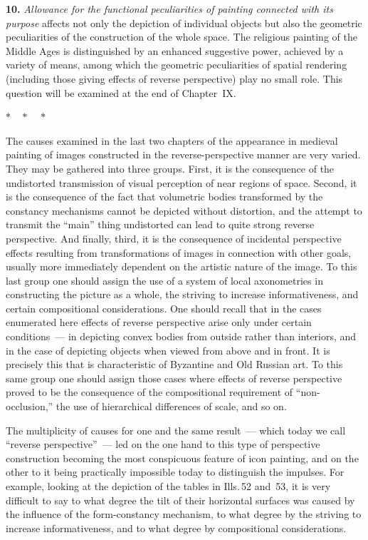 \medskip
\noindent\textbf{10.}\quad
\emph{Allowance for the functional peculiarities of painting connected with its
purpose} affects not only the depiction of individual objects but also the geometric
peculiarities of the construction of the whole space.  The religious painting of the
Middle Ages is distinguished by an enhanced suggestive power, achieved by a variety of
means, among which the geometric peculiarities of spatial rendering (including those
giving effects of reverse perspective) play no small role.  This question will be
examined at the end of Chapter~IX.

\medskip
\noindent
$* \quad * \quad *$
\medskip


The causes examined in the last two chapters of the appearance in medieval painting of
images constructed in the reverse-perspective manner are very varied.  They may be
gathered into three groups.  First, it is the consequence of the undistorted
transmission of visual perception of near regions of space.  Second, it is the
consequence of the fact that volumetric bodies transformed by the constancy mechanisms
cannot be depicted without distortion, and the attempt to transmit the ``main'' thing
undistorted can lead to quite strong reverse perspective.  And finally, third, it is
the consequence of incidental perspective effects resulting from transformations of
images in connection with other goals, usually more immediately dependent on the
artistic nature of the image.  To this last group one should assign the use of a
system of local axonometries in constructing the picture as a whole, the striving to
increase informativeness, and certain compositional considerations.  One should recall
that in the cases enumerated here effects of reverse perspective arise only under
certain conditions~--- in depicting convex bodies from outside rather than interiors,
and in the case of depicting objects when viewed from above and in front.  It is
precisely this that is characteristic of Byzantine and Old Russian art.  To this same
group one should assign those cases where effects of reverse perspective proved to be
the consequence of the compositional requirement of ``non-occlusion,'' the use of
hierarchical differences of scale, and so on.


The multiplicity of causes for one and the same result~--- which today we call
``reverse perspective''~--- led on the one hand to this type of perspective
construction becoming the most conspicuous feature of icon painting, and on the other
to it being practically impossible today to distinguish the impulses.  For example,
looking at the depiction of the tables in Ills.\,52 and~53, it is very difficult to
say to what degree the tilt of their horizontal surfaces was caused by the influence
of the form-constancy mechanism, to what degree by the striving to increase
informativeness, and to what degree by compositional considerations.

